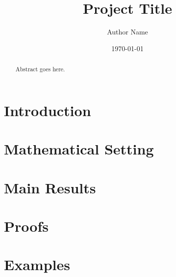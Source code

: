 \documentclass[11pt]{article}
\title{Project Title}
\author{Author Name}
\date{\today}
\begin{document}
\maketitle

\begin{abstract}
Abstract goes here.
\end{abstract}

\section{Introduction}

\section{Mathematical Setting}

\section{Main Results}

\section{Proofs}

\section{Examples}



\end{document}
